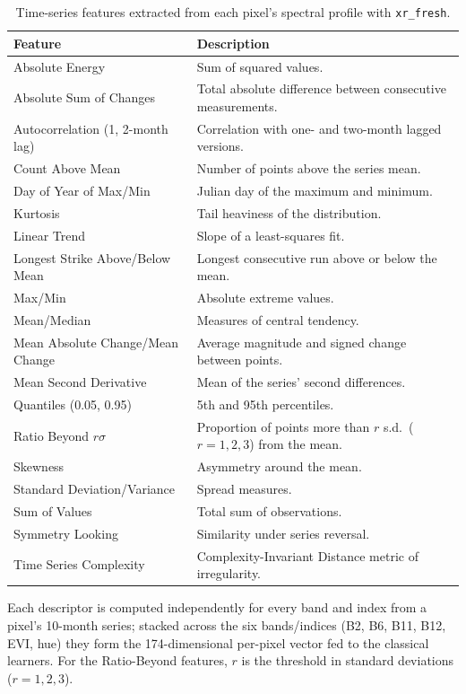 \documentclass[journal]{IEEEtran}
\begin{document}
\begin{table}[!t]
\centering
\footnotesize
\caption{Time-series features extracted from each pixel's spectral profile with \texttt{xr\_fresh}.}
\label{stab:features}
\renewcommand{\arraystretch}{1.15}
\begin{tabular}{@{}>{\raggedright\arraybackslash}p{}p{}@{}}
\toprule
\textbf{Feature} & \textbf{Description} \\
\midrule
Absolute Energy & Sum of squared values. \\
Absolute Sum of Changes & Total absolute difference between consecutive measurements. \\
Autocorrelation (1, 2-month lag) & Correlation with one- and two-month lagged versions. \\
Count Above Mean & Number of points above the series mean. \\
Day of Year of Max/Min & Julian day of the maximum and minimum. \\
Kurtosis & Tail heaviness of the distribution. \\
Linear Trend & Slope of a least-squares fit. \\
Longest Strike Above/Below Mean & Longest consecutive run above or below the mean. \\
Max/Min & Absolute extreme values. \\
Mean/Median & Measures of central tendency. \\
Mean Absolute Change/Mean Change & Average magnitude and signed change between points. \\
Mean Second Derivative & Mean of the series' second differences. \\
Quantiles (0.05, 0.95) & 5th and 95th percentiles. \\
Ratio Beyond $r\sigma$ & Proportion of points more than $r$ s.d.\ ($r=1,2,3$) from the mean. \\
Skewness & Asymmetry around the mean. \\
Standard Deviation/Variance & Spread measures. \\
Sum of Values & Total sum of observations. \\
Symmetry Looking & Similarity under series reversal. \\
Time Series Complexity & Complexity-Invariant Distance metric of irregularity. \\
\bottomrule
\end{tabular}
\par\vspace{3pt}
\begin{minipage}{\columnwidth}
\footnotesize
Each descriptor is computed independently for every band and index from a pixel's 10-month series;
stacked across the six bands/indices (B2, B6, B11, B12, EVI, hue) they form the 174-dimensional
per-pixel vector fed to the classical learners. For the Ratio-Beyond features, $r$ is the threshold
in standard deviations ($r=1,2,3$).
\end{minipage}
\end{table}
\end{document}
